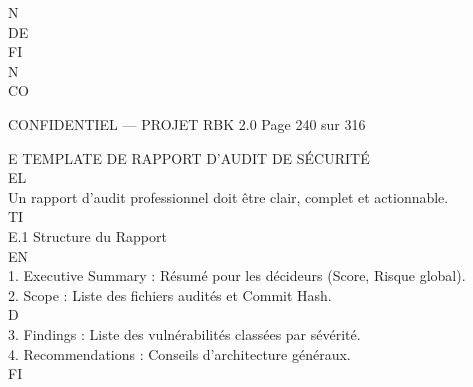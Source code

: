 \documentclass[12pt,landscape,a4paper]{article}
\newenvironment{confidential}
{\begin{tcolorbox}[
    colback=rbkred!5!white,
    colframe=rbkred!75!black,
    title=CONFIDENTIEL,
    fonttitle=\bfseries\color{white},
    coltitle=rbkred!75!black,
    breakable,
    enhanced,
    frame hidden,
    borderline west={2pt}{0pt}{rbkred!75!black}
]}
{\end{tcolorbox}}
\begin{document}
N\\
DE\\
FI\\
N\\
CO\\
\vspace{0.5em}
\vspace{0.5em}
\vspace{0.5em}
\vspace{0.5em}
\begin{confidential}CONFIDENTIEL — PROJET RBK 2.0                                        Page 240 sur 316\end{confidential}
E \textbar{} TEMPLATE DE RAPPORT D’AUDIT DE SÉCURITÉ\\
\vspace{0.5em}
\vspace{0.5em}
\vspace{0.5em}
\vspace{0.5em}
EL\\
Un rapport d’audit professionnel doit être clair, complet et actionnable.\\
\vspace{0.5em}
\vspace{0.5em}
\vspace{0.5em}
\vspace{0.5em}
TI\\
E.1 Structure du Rapport\\
\vspace{0.5em}
\vspace{0.5em}
\vspace{0.5em}
\vspace{0.5em}
EN\\
1. Executive Summary : Résumé pour les décideurs (Score, Risque global).\\
\vspace{0.5em}
2. Scope : Liste des fichiers audités et Commit Hash.\\
\vspace{0.5em}
\vspace{0.5em}
\vspace{0.5em}
\vspace{0.5em}
D\\
3. Findings : Liste des vulnérabilités classées par sévérité.\\
\vspace{0.5em}
4. Recommendations : Conseils d’architecture généraux.\\
\vspace{0.5em}
FI\\
\end{document}
